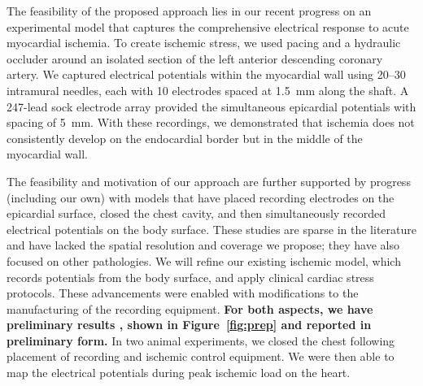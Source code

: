 The feasibility of the proposed approach lies in our recent progress on an
experimental model that captures the comprehensive electrical response to
acute myocardial
ischemia.\cite{BMB:Ara2009,KKA:Ara2014,RSM:Ara2016,BLZ:Zen2018a} To create
 ischemic stress, we used pacing and a hydraulic occluder around an isolated
 section of the left anterior descending coronary artery. We captured
 electrical potentials within the myocardial wall using 20--30 intramural
 needles, each with 10 electrodes spaced at 1.5~mm along the shaft. A  247-lead sock electrode array provided the simultaneous epicardial
 potentials with spacing of 5~mm.\cite{BMB:Ara2009,KKA:Ara2014,RSM:Ara2016}
With these recordings, we demonstrated that ischemia does not consistently
develop on the endocardial border but in the middle of the myocardial
wall.\cite{RSM:Ara2016}

The feasibility and motivation of our approach are further supported by
progress (including our own) with models that have placed recording
electrodes on the epicardial surface, closed the chest cavity, and then
simultaneously recorded electrical potentials on the body
surface.\cite{BLZ:Spa1975,RSM:Bea2015a,BLZ:Clu2017,BLZ:Zen2018a} These
 studies are sparse in the literature and have lacked the spatial resolution
 and coverage we propose; they have also focused on other pathologies.
 We will refine our existing ischemic model,
 which records potentials from
 the body surface, and apply clinical cardiac stress
 protocols.\cite{BLZ:Zen2018a}
These advancements were enabled with modifications to the manufacturing of
the recording equipment. \textbf{For both aspects, we have preliminary
  results , shown in Figure~\ref{fig:prep} and reported in preliminary
  form.}\cite{BLZ:Zen2018a} In two animal experiments, we closed the chest
following placement of recording and ischemic control equipment. We were
then able to map the electrical potentials during peak ischemic load on the
heart.





